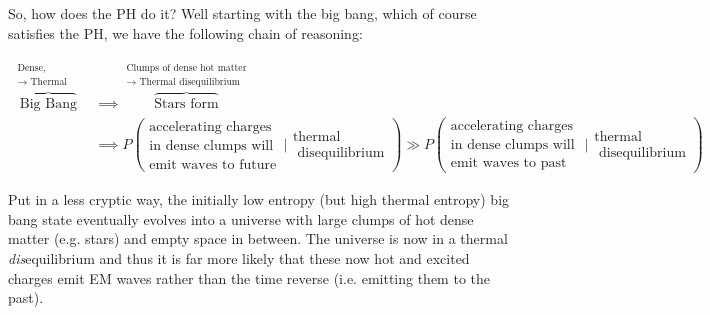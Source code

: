\documentclass{article}
\begin{document}
So, how does the PH do it? Well starting with the big bang, which of course satisfies the PH, we have the following chain of reasoning:


\begin{align*}
  \overbrace{\text{Big Bang}}^{\substack{\text{Dense, uniformly hot state}\\\rightarrow\text{ Thermal equilibrium}}}
  &\implies\overbrace{\text{Stars form}}^{\substack{\text{Clumps of dense hot matter}\\\rightarrow\text{ Thermal disequilibrium}}}\\
  &\implies P\left(\substack{\text{accelerating charges}\\\text{in dense clumps will }\\\text{emit waves to future}}|\substack{\text{thermal}\\\text{ disequilibrium}}\right)\gg
  P\left(\substack{\text{accelerating charges}\\\text{in dense clumps will }\\\text{emit waves to past}}|\substack{\text{thermal}\\\text{ disequilibrium}}\right)
\end{align*}

Put in a less cryptic way, the initially low entropy (but high thermal entropy) big bang state eventually evolves into a universe with large clumps of hot dense matter (e.g. stars) and empty space in between. The universe is now in a thermal \textit{dis}equilibrium and thus it is far more likely that these now hot and excited charges emit EM waves rather than the time reverse (i.e. emitting them to the past).
\end{document}
